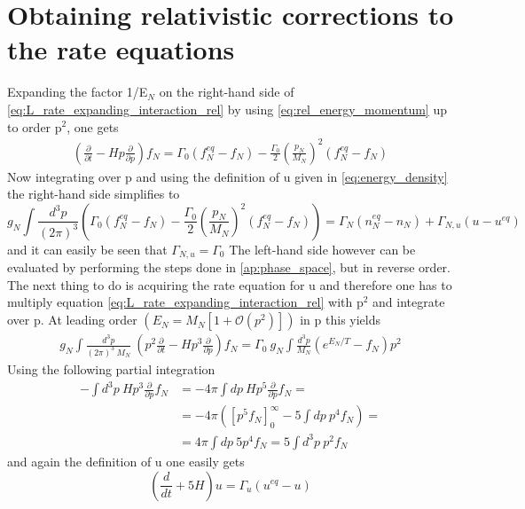 \section{Obtaining relativistic corrections to the rate equations}
\label{ap:rel_corrections}
Expanding the factor 1/E$_N$ on the right-hand side of \ref{eq:L_rate_expanding_interaction_rel} by using \ref{eq:rel_energy_momentum} up to order p$^2$, one gets
\begin{align*}
		\left(\frac{\partial}{\partial t}-Hp\frac{\partial}{\partial p}\right)f_N=\Gamma_0\left(f_N^{eq}-f_N\right)-\frac{\Gamma_0}{2}\left(\frac{p_N}{M_N}\right)^2\left(f_N^{eq}-f_N\right)
\end{align*}
Now integrating over p and using the definition of u given in \ref{eq:energy_density} the right-hand side simplifies to
\begin{equation*}
	g_N\int \frac{d^3p}{(2\pi)^3}\left(\Gamma_0\left(f_N^{eq}-f_N\right)-\frac{\Gamma_0}{2}\left(\frac{p_N}{M_N}\right)^2\left(f_N^{eq}-f_N\right)\right)=\Gamma_N\left(n_N^{eq}-n_N\right)+\Gamma_{N,u}\left(u-u^{eq}\right)
\end{equation*}
and it can easily be seen that $\Gamma_{N,u}=\Gamma_{0}$ \newline
The left-hand side however can be evaluated by performing the steps done in \ref{ap:phase_space}, but in reverse order. \newline
The next thing to do is acquiring the rate equation for u and therefore one has to multiply equation \ref{eq:L_rate_expanding_interaction_rel} with p$^2$ and integrate over p. At leading order $\left(E_N=M_N\left[1+\mathcal{O}(p^2)\right]\right)$ in p this yields
\begin{align*}
	g_N\int \frac{d^3p}{(2\pi)^3\:M_N}\:\left(p^2\frac{\partial}{\partial t}-Hp^3\frac{\partial}{\partial p}\right)f_N=\Gamma_0\:g_N\int \frac{d^3p}{M_N}\left(e^{E_N/T}-f_N\right)p^2
\end{align*}
Using the following partial integration
\begin{align*}
	-\int d^3p\:Hp^3\frac{\partial}{\partial p}f_N&=-4\pi\int dp\:Hp^5\frac{\partial}{\partial p}f_N=\\
	&=-4\pi\left(\left[p^5f_N\right]_0^\infty-5\int dp\: p^4f_N\right)=\\
	&=4\pi\int dp\: 5p^4f_N=5\int d^3p\: p^2f_N
\end{align*}
and again the definition of u one easily gets
\begin{equation*}
	\left(\frac{d}{dt}+5H\right)u=\Gamma_u\left(u^{eq}-u\right)
\end{equation*}
